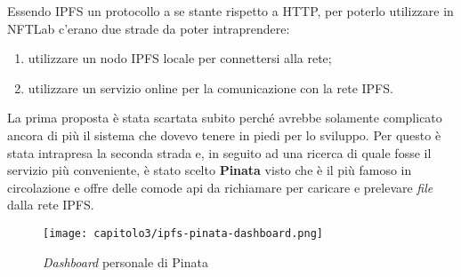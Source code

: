 


Essendo IPFS un protocollo a se stante rispetto a HTTP, per poterlo utilizzare in NFTLab c'erano due strade da poter intraprendere:
\begin{enumerate}
  \item utilizzare un nodo IPFS locale per connettersi alla rete;
  \item utilizzare un servizio online per la comunicazione con la rete IPFS.
\end{enumerate}

La prima proposta è stata scartata subito perché avrebbe solamente complicato ancora di più il sistema che dovevo tenere in piedi per lo sviluppo. Per questo è stata intrapresa la seconda strada e, in seguito ad una ricerca di quale fosse il servizio più conveniente, è stato scelto \textbf{Pinata} visto che è il più famoso in circolazione e  offre delle comode \gls{api} da richiamare per caricare e prelevare \textit{file} dalla rete IPFS.

\begin{figure}[h!]
  \centering
  \texttt{[image: capitolo3/ipfs-pinata-dashboard.png]}
  \caption{\textit{Dashboard} personale di Pinata}
\end{figure}
